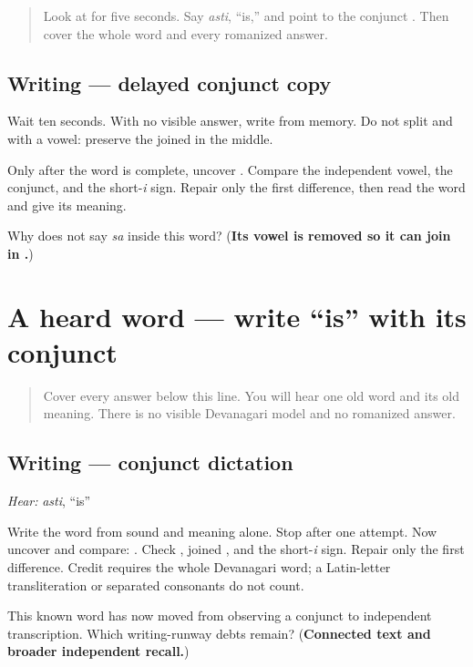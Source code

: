 \label{lesson:SA-W10-asti-delayed-copy}



\begin{quote}
Look at \textbf{} for five seconds. Say \emph{asti}, “is,” and point to the conjunct \textbf{}. Then cover the whole word and every romanized answer.
\end{quote}

\subsection*{Writing — delayed conjunct copy}
Wait ten seconds. With no visible answer, write \textbf{} from memory. Do not split \textbf{} and \textbf{} with a vowel: preserve the joined \textbf{} in the middle.

Only after the word is complete, uncover \textbf{}. Compare the independent vowel, the conjunct, and the short-\emph{i} sign. Repair only the first difference, then read the word and give its meaning.

\begin{tcolorbox}[breakable,colback=teal!4,colframe=teal!35!black,title={Before you move on}]
Why does \textbf{} not say \emph{sa} inside this word? (\textbf{Its vowel is removed so it can join  in .})
\end{tcolorbox}
\section[\texorpdfstring{\sk{अस्ति} (asti)}{अस्ति (asti)}]{A heard word — write “is” with its conjunct}

\label{lesson:SA-W10-asti-dictation}



\begin{quote}
Cover every answer below this line. You will hear one old word and its old meaning. There is no visible Devanagari model and no romanized answer.
\end{quote}

\subsection*{Writing — conjunct dictation}
\emph{Hear:} \emph{asti}, “is”

Write the word from sound and meaning alone. Stop after one attempt. Now uncover and compare: \textbf{}. Check \textbf{}, joined \textbf{}, and the short-\emph{i} sign. Repair only the first difference. Credit requires the whole Devanagari word; a Latin-letter transliteration or separated consonants do not count.

\begin{tcolorbox}[breakable,colback=teal!4,colframe=teal!35!black,title={Before you move on}]
This known word has now moved from observing a conjunct to independent transcription. Which writing-runway debts remain? (\textbf{Connected text and broader independent recall.})
\end{tcolorbox}
